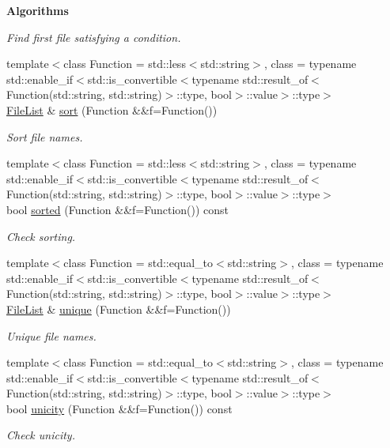 \begin{Indent}{\bf Algorithms}
\begin{DoxyCompactItemize}
\begin{DoxyCompactList}\small\item\em Find first file satisfying a condition. \end{DoxyCompactList}\item 
{\footnotesize template$<$class Function  = std\-::less$<$std\-::string$>$, class  = typename std\-::enable\-\_\-if$<$std\-::is\-\_\-convertible$<$typename std\-::result\-\_\-of$<$\-Function(std\-::string, std\-::string)$>$\-::type, bool$>$\-::value$>$\-::type$>$ }\\\hyperlink{exceptionmagrathea_1_1FileList}{File\-List} \& \hyperlink{exceptionmagrathea_1_1FileList_acc7f1d6850562a3057c11a91af056845}{sort} (Function \&\&f=Function())
\begin{DoxyCompactList}\small\item\em Sort file names. \end{DoxyCompactList}\item 
{\footnotesize template$<$class Function  = std\-::less$<$std\-::string$>$, class  = typename std\-::enable\-\_\-if$<$std\-::is\-\_\-convertible$<$typename std\-::result\-\_\-of$<$\-Function(std\-::string, std\-::string)$>$\-::type, bool$>$\-::value$>$\-::type$>$ }\\bool \hyperlink{exceptionmagrathea_1_1FileList_ad85d77b9c3f5176e3d61866eedcfbadb}{sorted} (Function \&\&f=Function()) const 
\begin{DoxyCompactList}\small\item\em Check sorting. \end{DoxyCompactList}\item 
{\footnotesize template$<$class Function  = std\-::equal\-\_\-to$<$std\-::string$>$, class  = typename std\-::enable\-\_\-if$<$std\-::is\-\_\-convertible$<$typename std\-::result\-\_\-of$<$\-Function(std\-::string, std\-::string)$>$\-::type, bool$>$\-::value$>$\-::type$>$ }\\\hyperlink{exceptionmagrathea_1_1FileList}{File\-List} \& \hyperlink{exceptionmagrathea_1_1FileList_ab3320f9edc092dbe8a2f5dd6f9f2bb69}{unique} (Function \&\&f=Function())
\begin{DoxyCompactList}\small\item\em Unique file names. \end{DoxyCompactList}\item 
{\footnotesize template$<$class Function  = std\-::equal\-\_\-to$<$std\-::string$>$, class  = typename std\-::enable\-\_\-if$<$std\-::is\-\_\-convertible$<$typename std\-::result\-\_\-of$<$\-Function(std\-::string, std\-::string)$>$\-::type, bool$>$\-::value$>$\-::type$>$ }\\bool \hyperlink{exceptionmagrathea_1_1FileList_a72c4b328ee2c982eafecf26005dda989}{unicity} (Function \&\&f=Function()) const 
\begin{DoxyCompactList}\small\item\em Check unicity. \end{DoxyCompactList}\end{DoxyCompactItemize}
\end{Indent}
